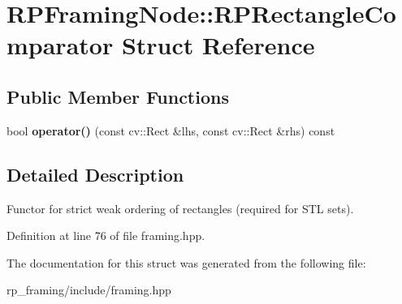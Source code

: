 \hypertarget{struct_r_p_framing_node_1_1_r_p_rectangle_comparator}{\section{\-R\-P\-Framing\-Node\-:\-:\-R\-P\-Rectangle\-Comparator \-Struct \-Reference}
\label{struct_r_p_framing_node_1_1_r_p_rectangle_comparator}
}
\subsection*{\-Public \-Member \-Functions}
\begin{DoxyCompactItemize}
\item 
\hypertarget{struct_r_p_framing_node_1_1_r_p_rectangle_comparator_ae9f464821066e9a935b9fe44e0697133}{bool {\bfseries operator()} (const cv\-::\-Rect \&lhs, const cv\-::\-Rect \&rhs) const }\label{struct_r_p_framing_node_1_1_r_p_rectangle_comparator_ae9f464821066e9a935b9fe44e0697133}

\end{DoxyCompactItemize}


\subsection{\-Detailed \-Description}
\-Functor for strict weak ordering of rectangles (required for \-S\-T\-L sets). 

\-Definition at line 76 of file framing.\-hpp.



\-The documentation for this struct was generated from the following file\-:\begin{DoxyCompactItemize}
\item 
rp\-\_\-framing/include/framing.\-hpp\end{DoxyCompactItemize}
